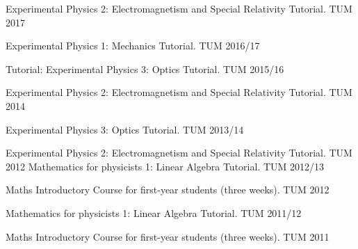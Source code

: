   


\begin{cvhonors}

  \cvhonor
    {Experimental Physics 2: Electromagnetism and Special Relativity} %
    {Tutorial.} %
    {TUM} %
    {2017} %

  \cvhonor
    {Experimental Physics 1: Mechanics} %
    {Tutorial.} %
    {TUM} %
    {2016/17} %

  \cvhonor
    {Tutorial: Experimental Physics 3: Optics} %
    {Tutorial.} %
    {TUM} %
    {2015/16} %

  \cvhonor
    {Experimental Physics 2: Electromagnetism and Special Relativity} %
    {Tutorial.} %
    {TUM} %
    {2014} %

  \cvhonor
    {Experimental Physics 3: Optics} %
    {Tutorial.} %
    {TUM} %
    {2013/14} %

  \cvhonor
    {Experimental Physics 2: Electromagnetism and Special Relativity} %
    {Tutorial.} %
    {TUM} %
    {2012} %
  \cvhonor
    {Mathematics for physicists 1: Linear Algebra} %
    {Tutorial.} %
    {TUM} %
    {2012/13} %

  \cvhonor
    {Maths Introductory Course} %
    {for first-year students (three weeks).} %
    {TUM} %
    {2012} %

  \cvhonor
    {Mathematics for physicists 1: Linear Algebra} %
    {Tutorial.} %
    {TUM} %
    {2011/12} %

  \cvhonor
    {Maths Introductory Course} %
    {for first-year students (three weeks).} %
    {TUM} %
    {2011} %
\end{cvhonors}


